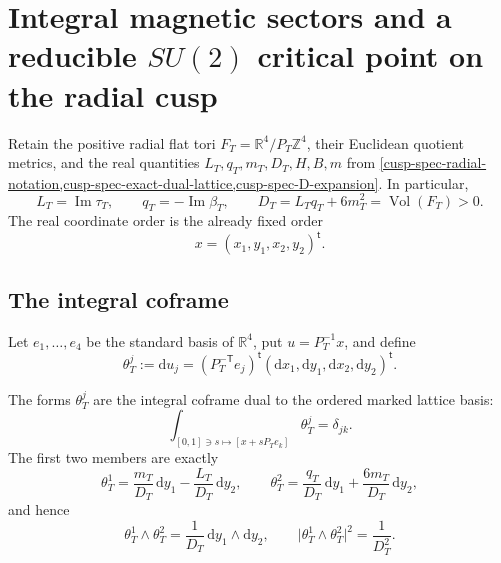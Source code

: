 \section{Integral magnetic sectors and a reducible
\texorpdfstring{\(SU(2)\)}{SU(2)} critical point on the radial cusp}
\label{cusp-magnetic-section}

Retain the positive radial flat tori
\(F_T=\mathbb R^4/P_T\mathbb Z^4\), their Euclidean quotient metrics, and
the real quantities \(L_T,q_T,m_T,D_T,H,B,m\) from
\cref{cusp-spec-radial-notation,cusp-spec-exact-dual-lattice,cusp-spec-D-expansion}.
In particular,
\[
 L_T=\operatorname{Im}\tau_T,\qquad
 q_T=-\operatorname{Im}\beta_T,\qquad
 D_T=L_Tq_T+6m_T^2=\operatorname{Vol}(F_T)>0.
\]
The real coordinate order is the already fixed order
\[
 x=(x_1,y_1,x_2,y_2)^{\mathsf t}.
\]

\subsection{The integral coframe}

Let \(e_1,\ldots,e_4\) be the standard basis of \(\mathbb R^4\), put
\(u=P_T^{-1}x\), and define
\begin{equation}
 \theta_T^j:=\mathrm du_j
 =(P_T^{-\mathsf T}e_j)^{\mathsf t}
   (\mathrm dx_1,\mathrm dy_1,\mathrm dx_2,\mathrm dy_2)^{\mathsf t}.
 \label{cusp-magnetic-integral-coframe}
\end{equation}

\begin{proposition}
\label{cusp-magnetic-coframe-proposition}
The forms \(\theta_T^j\) are the integral coframe dual to the ordered
marked lattice basis:
\[
 \int_{[0,1]\ni s\mapsto[x+sP_Te_k]}\theta_T^j=\delta_{jk}.
\]
The first two members are exactly
\begin{equation}
 \theta_T^1=\frac{m_T}{D_T}\,\mathrm dy_1
             -\frac{L_T}{D_T}\,\mathrm dy_2,
 \qquad
 \theta_T^2=\frac{q_T}{D_T}\,\mathrm dy_1
             +\frac{6m_T}{D_T}\,\mathrm dy_2,
 \label{cusp-magnetic-first-two-covectors}
\end{equation}
and hence
\begin{equation}
 \theta_T^1\wedge\theta_T^2
 =\frac1{D_T}\,\mathrm dy_1\wedge\mathrm dy_2,
 \qquad
 \lvert\theta_T^1\wedge\theta_T^2\rvert^2
 =\frac1{D_T^2}.
 \label{cusp-magnetic-wedge-norm}
\end{equation}
\end{proposition}

